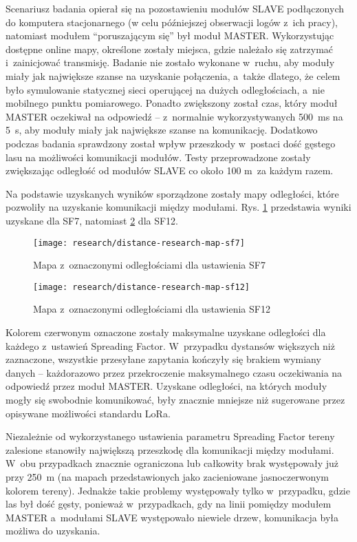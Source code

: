 Scenariusz badania opierał się na pozostawieniu modułów SLAVE podłączonych do komputera stacjonarnego (w celu
późniejszej obserwacji logów z~ich pracy), natomiast modułem \enquote{poruszającym się} był moduł MASTER. Wykorzystując
dostępne online mapy, określone zostały miejsca, gdzie należało się zatrzymać i~zainicjować transmisję. Badanie nie
zostało wykonane w~ruchu, aby moduły miały jak największe szanse na uzyskanie połączenia, a~także dlatego, że celem było
symulowanie statycznej sieci operującej na dużych odległościach, a~nie mobilnego punktu pomiarowego. Ponadto zwiększony
został czas, który moduł MASTER oczekiwał na odpowiedź -- z~normalnie wykorzystywanych 500~ms na 5~s, aby moduły miały
jak największe szanse na komunikację. Dodatkowo podczas badania sprawdzony został wpływ przeszkody w~postaci dość
gęstego lasu na możliwości komunikacji modułów. Testy przeprowadzone zostały zwiększając odległość od modułów SLAVE co
około 100 m~za każdym razem.

Na podstawie uzyskanych wyników sporządzone zostały mapy odległości, które pozwoliły na uzyskanie komunikacji między
modułami. Rys. \ref{img:distance-research-map-sf7} przedstawia wyniki uzyskane dla SF7, natomiast
\ref{img:distance-research-map-sf12} dla SF12.

\begin{figure}[!htbp]
    \centering
    \texttt{[image: research/distance-research-map-sf7]}
    \caption{\label{img:distance-research-map-sf7}Mapa z~oznaczonymi odległościami dla ustawienia SF7}
\end{figure}

\begin{figure}[!htbp]
    \centering
    \texttt{[image: research/distance-research-map-sf12]}
    \caption{\label{img:distance-research-map-sf12}Mapa z~oznaczonymi odległościami dla ustawienia SF12}
\end{figure}

\FloatBarrier
Kolorem czerwonym oznaczone zostały maksymalne uzyskane odległości dla każdego z~ustawień Spreading Factor. W~przypadku
dystansów większych niż zaznaczone, wszystkie przesyłane zapytania kończyły się brakiem wymiany danych -- każdorazowo
przez przekroczenie maksymalnego czasu oczekiwania na odpowiedź przez moduł MASTER. Uzyskane odległości, na których
moduły mogły się swobodnie komunikować, były znacznie mniejsze niż sugerowane przez opisywane możliwości standardu LoRa.

Niezależnie od wykorzystanego ustawienia parametru Spreading Factor tereny zalesione stanowiły największą przeszkodę dla
komunikacji między modułami. W~obu przypadkach znacznie ograniczona lub całkowity brak występowały już przy 250~m (na
mapach przedstawionych jako zacieniowane jasnoczerwonym kolorem tereny). Jednakże takie problemy występowały tylko
w~przypadku, gdzie las był dość gęsty, ponieważ w~przypadkach, gdy na linii pomiędzy modułem MASTER a~modułami SLAVE
występowało niewiele drzew, komunikacja była możliwa do uzyskania.

